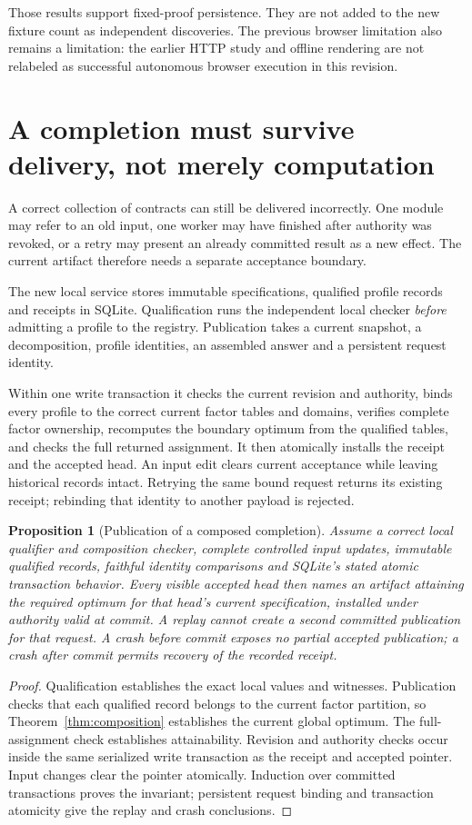 \documentclass[11pt,letterpaper]{article}
\newtheorem{proposition}[theorem]{Proposition}
\theoremstyle{definition}\newtheorem{definition}[theorem]{Definition}
\theoremstyle{remark}\newtheorem{remark}[theorem]{Remark}
\begin{document}
Those results support fixed-proof persistence. They are not added to the new fixture count as independent discoveries. The previous browser limitation also remains a limitation: the earlier HTTP study and offline rendering are not relabeled as successful autonomous browser execution in this revision.

\section{A completion must survive delivery, not merely computation}
\label{sec:store}
A correct collection of contracts can still be delivered incorrectly. One module may refer to an old input, one worker may have finished after authority was revoked, or a retry may present an already committed result as a new effect. The current artifact therefore needs a separate acceptance boundary.

The new local service stores immutable specifications, qualified profile records and receipts in SQLite. Qualification runs the independent local checker \emph{before} admitting a profile to the registry. Publication takes a current snapshot, a decomposition, profile identities, an assembled answer and a persistent request identity.

Within one write transaction it checks the current revision and authority, binds every profile to the correct current factor tables and domains, verifies complete factor ownership, recomputes the boundary optimum from the qualified tables, and checks the full returned assignment. It then atomically installs the receipt and the accepted head. An input edit clears current acceptance while leaving historical records intact. Retrying the same bound request returns its existing receipt; rebinding that identity to another payload is rejected.

\begin{proposition}[Publication of a composed completion]
\label{prop:publish}
Assume a correct local qualifier and composition checker, complete controlled input updates, immutable qualified records, faithful identity comparisons and SQLite's stated atomic transaction behavior. Every visible accepted head then names an artifact attaining the required optimum for that head's current specification, installed under authority valid at commit. A replay cannot create a second committed publication for that request. A crash before commit exposes no partial accepted publication; a crash after commit permits recovery of the recorded receipt.
\end{proposition}
\begin{proof}
Qualification establishes the exact local values and witnesses. Publication checks that each qualified record belongs to the current factor partition, so Theorem~\ref{thm:composition} establishes the current global optimum. The full-assignment check establishes attainability. Revision and authority checks occur inside the same serialized write transaction as the receipt and accepted pointer. Input changes clear the pointer atomically. Induction over committed transactions proves the invariant; persistent request binding and transaction atomicity give the replay and crash conclusions.
\end{proof}
\end{document}
